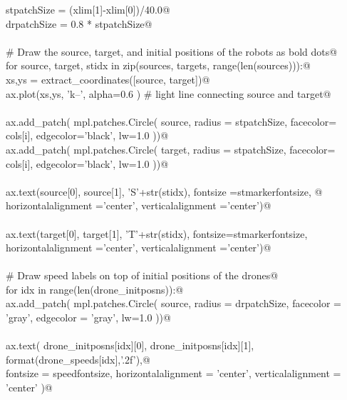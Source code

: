 \documentclass[10pt, english, oneside]{report}
\begin{document}
\begin{appendices}
\begin{flushleft}
\begin{minipage}{\linewidth}
\begin{list}{}{}
\mbox{}\verb@    stpatchSize  = (xlim[1]-xlim[0])/40.0@\\
\mbox{}\verb@    drpatchSize  = 0.8 * stpatchSize@\\
\mbox{}\verb@@\\
\mbox{}\verb@    # Draw the source, target, and initial positions of the robots as bold dots@\\
\mbox{}\verb@    for source, target, stidx in zip(sources, targets, range(len(sources))):@\\
\mbox{}\verb@         xs,ys = extract_coordinates([source, target])@\\
\mbox{}\verb@         ax.plot(xs,ys, 'k--', alpha=0.6 ) # light line connecting source and target@\\
\mbox{}\verb@@\\
\mbox{}\verb@         ax.add_patch( mpl.patches.Circle( source, radius = stpatchSize, facecolor= cols[i], edgecolor='black', lw=1.0 ))@\\
\mbox{}\verb@         ax.add_patch( mpl.patches.Circle( target, radius = stpatchSize, facecolor= cols[i], edgecolor='black', lw=1.0 ))@\\
\mbox{}\verb@@\\
\mbox{}\verb@         ax.text(source[0], source[1], 'S'+str(stidx), fontsize =stmarkerfontsize, @\\
\mbox{}\verb@                 horizontalalignment ='center', verticalalignment   ='center')@\\
\mbox{}\verb@@\\
\mbox{}\verb@         ax.text(target[0], target[1], 'T'+str(stidx), fontsize=stmarkerfontsize,\@\\
\mbox{}\verb@                 horizontalalignment ='center', verticalalignment   ='center')@\\
\mbox{}\verb@@\\
\mbox{}\verb@    # Draw speed labels on top of initial positions of the drones@\\
\mbox{}\verb@    for idx in range(len(drone_initposns)):@\\
\mbox{}\verb@         ax.add_patch( mpl.patches.Circle( source, radius = drpatchSize, facecolor = 'gray', edgecolor = 'gray', lw=1.0 ))@\\
\mbox{}\verb@@\\
\mbox{}\verb@         ax.text( drone_initposns[idx][0], drone_initposns[idx][1], format(drone_speeds[idx],'.2f'),@\\
\mbox{}\verb@                  fontsize = speedfontsize, horizontalalignment = 'center', verticalalignment   = 'center' )@\\

\end{list}
\end{minipage}
\end{flushleft}
\end{appendices}
\end{document}
